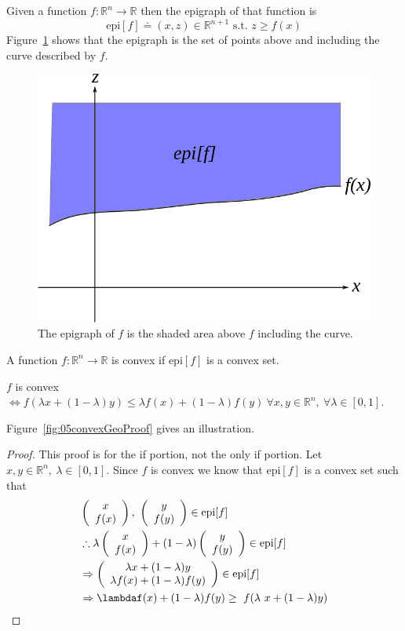 \begin{definition}
Given a function $f:\mathbb{R}^n\to\mathbb{R}$ then the epigraph of that function is
$$\text{epi}[f] \doteq (x,z)\in\mathbb{R}^{n+1} \text{~s.t.~} z\geq f(x)$$
Figure~\ref{fig:05epigraph} shows that the epigraph is the set of points above and including the curve described by $f$.
\end{definition}

\begin{figure}[ht!]
\centering
\includegraphics[width=.4\textwidth]{images/05epigraph}
\caption{The epigraph of $f$ is the shaded area above $f$ including the curve.}
\label{fig:05epigraph}
\end{figure}

\begin{definition}
A function $f:\mathbb{R}^n\to\mathbb{R}$ is convex if $\text{epi}[f]$ is a convex set.
\end{definition}

\begin{theorem}
$f$ is convex $\Leftrightarrow f(\lambda x + (1-\lambda)y)\leq \lambda f(x) + (1-\lambda)f(y)~\forall x,y\in\mathbb{R}^n,~\forall \lambda\in[0,1]$.
\end{theorem}
Figure~\ref{fig:05convexGeoProof} gives an illustration.
\begin{proof}
This proof is for the if portion, not the only if portion.
Let $x,y\in\mathbb{R}^n,~\lambda\in[0,1]$.
Since $f$ is convex we know that $\text{epi}[f]$ is a convex set such that
\begin{align*}
&\left(\begin{array}{c} x \\ f(x) \end{array}\right),~\left(\begin{array}{c} y \\ f(y) \end{array}\right) \in\text{epi}[f] \\
&\therefore\lambda\left(\begin{array}{c} x \\ f(x) \end{array}\right) + (1-\lambda)\left(\begin{array}{c} y \\ f(y) \end{array}\right) \in\text{epi}[f] \\
&\Rightarrow\left(\begin{array}{c} \lambda x+(1-\lambda)y \\ \lambda f(x) + (1-\lambda)f(y) \end{array}\right) \in\text{epi}[f] \\
&\Rightarrow\lambdaf(x) + (1-\lambda) f (y) \geq~f (\lambda~x + (1-\lambda) y)
\end{align*}
\end{proof}

